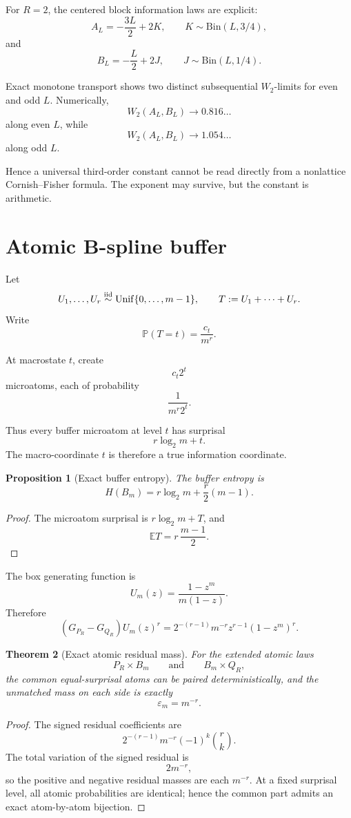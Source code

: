 \documentclass[11pt,a4paper]{article}
\newtheorem{theorem}{Theorem}[section]
\newtheorem{proposition}[theorem]{Proposition}
\newcommand{\E}{\mathbb E}
\newcommand{\PP}{\mathbb P}
\newcommand{\eps}{\varepsilon}
\begin{document}
For \(R=2\), the centered block information laws are explicit:
\[
A_L
=
-\frac{3L}{2}+2K,
\qquad
K\sim\mathrm{Bin}(L,3/4),
\]
and
\[
B_L
=
-\frac{L}{2}+2J,
\qquad
J\sim\mathrm{Bin}(L,1/4).
\]

Exact monotone transport shows two distinct subsequential \(W_2\)-limits
for even and odd \(L\).  Numerically,
\[
W_2(A_L,B_L)
\to
0.816\ldots
\]
along even \(L\), while
\[
W_2(A_L,B_L)
\to
1.054\ldots
\]
along odd \(L\).

Hence a universal third-order constant cannot be read directly from a
nonlattice Cornish--Fisher formula.  The exponent may survive, but the
constant is arithmetic.

\section{Atomic B-spline buffer}

Let
\[
U_1,\ldots,U_r
\stackrel{\rm iid}{\sim}
\mathrm{Unif}\{0,\ldots,m-1\},
\qquad
T:=U_1+\cdots+U_r.
\]
Write
\[
\PP(T=t)=\frac{c_t}{m^r}.
\]

At macrostate \(t\), create
\[
c_t2^t
\]
microatoms, each of probability
\[
\frac{1}{m^r2^t}.
\]

Thus every buffer microatom at level \(t\) has surprisal
\[
\boxed{
r\log_2m+t.
}
\]
The macro-coordinate \(t\) is therefore a true information coordinate.

\begin{proposition}[Exact buffer entropy]
The buffer entropy is
\[
\boxed{
H(B_m)
=
r\log_2m+\frac r2(m-1).
}
\]
\end{proposition}

\begin{proof}
The microatom surprisal is \(r\log_2m+T\), and
\[
\E T
=
r\,\frac{m-1}{2}.
\]
\end{proof}

The box generating function is
\[
U_m(z)
=
\frac{1-z^m}{m(1-z)}.
\]
Therefore
\[
(G_{P_R}-G_{Q_R})U_m(z)^r
=
2^{-(r-1)}m^{-r}
z^{r-1}(1-z^m)^r.
\]

\begin{theorem}[Exact atomic residual mass]
For the extended atomic laws
\[
P_R\times B_m
\qquad\text{and}\qquad
B_m\times Q_R,
\]
the common equal-surprisal atoms can be paired deterministically, and the
unmatched mass on each side is exactly
\[
\boxed{
\eps_m=m^{-r}.
}
\]
\end{theorem}

\begin{proof}
The signed residual coefficients are
\[
2^{-(r-1)}m^{-r}
(-1)^k\binom{r}{k}.
\]
The total variation of the signed residual is
\[
2m^{-r},
\]
so the positive and negative residual masses are each \(m^{-r}\).
At a fixed surprisal level, all atomic probabilities are identical;
hence the common part admits an exact atom-by-atom bijection.
\end{proof}
\end{document}
